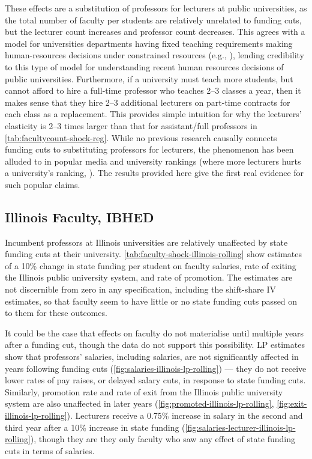 These effects are a substitution of professors for lecturers at public universities, as the total number of faculty per students are relatively unrelated to funding cuts, but the lecturer count increases and professor count decreases.
This agrees with a model for universities departments having fixed teaching requirements making human-resources decisions under constrained resources (e.g., \citealt{abe2015implications}), lending credibility to this type of model for understanding recent human resources decisions of public universities.
Furthermore, if a university must teach more students, but cannot afford to hire a full-time professor who teaches 2--3 classes a year, then it makes sense that they hire 2--3 additional lecturers on part-time contracts for each class as a replacement.
This provides simple intuition for why the lecturers' elasticity is 2--3 times larger than that for assistant/full professors in \autoref{tab:facultycount-shock-reg}.
While no previous research causally connects funding cuts to substituting professors for lecturers, the phenomenon has been alluded to in popular media \citep{wiu2016} and university rankings (where more lecturers hurts a university's ranking, \citealt{usnews2023}).
The results provided here give the first real evidence for such popular claims.

\subsection{Illinois Faculty, IBHED}
Incumbent professors at Illinois universities are relatively unaffected by state funding cuts at their university.
\autoref{tab:faculty-shock-illinois-rolling} show estimates of a 10\% change in state funding per student on faculty salaries, rate of exiting the Illinois public university system, and rate of promotion.
The estimates are not discernible from zero in any specification, including the shift-share IV estimates, so that faculty seem to have little or no state funding cuts passed on to them for these outcomes.

It could be the case that effects on faculty do not materialise until multiple years after a funding cut, though the data do not support this possibility.
LP estimates show that professors' salaries, including salaries, are not significantly affected in years following funding cuts (\autoref{fig:salaries-illinois-lp-rolling}) --- they do not receive lower rates of pay raises, or delayed salary cuts, in response to state funding cuts.
Similarly, promotion rate and rate of exit from the Illinois public university system are also unaffected in later years (\autoref{fig:promoted-illinois-lp-rolling}, \ref{fig:exit-illinois-lp-rolling}).
Lecturers receive a 0.75\% increase in salary in the second and third year after a 10\% increase in state funding (\autoref{fig:salaries-lecturer-illinois-lp-rolling}), though they are they only faculty who saw any effect of state funding cuts in terms of salaries.

